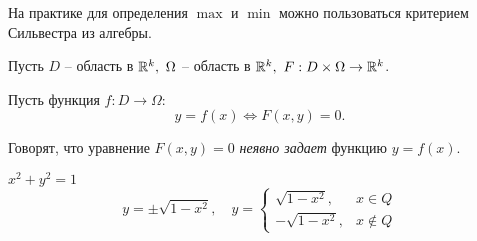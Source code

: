 \begin{remark}
    На практике для определения $\max$ и $\min$ можно пользоваться критерием Сильвестра из алгебры.
\end{remark}

\begin{definition}
    Пусть $D$ -- область в $\mathbb{R}^k, \ \Omega$ -- область в $\mathbb{R}^k, \ F: D \times \Omega \rightarrow \mathbb{R}^k $.

    Пусть функция $f:D \rightarrow\Omega:$
    \[
        y = f(x) \iff F(x,y) = 0.
    \]

    Говорят, что уравнение $F(x,y) = 0$ \emph{неявно задает} функцию $y = f(x)$.
\end{definition}

\begin{example}
    $x^2 + y^2 = 1$
    \[
        y = \pm\sqrt{1 - x^2}, \quad y = \left\{\begin{array}{rl}
            \sqrt{1-x^2},  & x \in Q    \\
            -\sqrt{1-x^2}, & x \notin Q
        \end{array}\right.
    \]
\end{example}